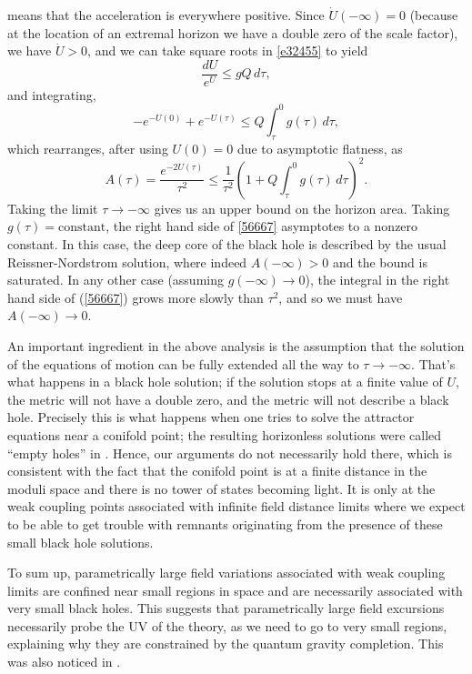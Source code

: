 \documentclass[11pt]{article}
\numberwithin{equation}{section}
\newcommand{\eq}[1]{(\ref{#1})}
\numberwithin{equation}{section}
\theoremstyle{remark}
\begin{document}
means that the acceleration is everywhere positive. Since $\dot{U}(-\infty)=0$ (because at the location of an extremal horizon we have a double zero of the scale factor), we have $\dot{U}>0$, and we can take square roots in \eqref{e32455} to yield
\begin{equation} \frac{dU}{e^{U}}\leq g Q\, d\tau,\end{equation}
and integrating,
\begin{equation} -e^{-U(0)}+e^{-U(\tau)}\leq Q \int_{\tau}^0 g(\tau)\, d\tau,\end{equation}
which rearranges, after using $U(0)=0$ due to asymptotic flatness, as
\begin{equation}A(\tau)=\frac{ e^{-2U(\tau)}}{\tau^2}\leq \frac{1}{\tau^2}\left(1+  Q \int_{\tau}^0 g(\tau)\, d\tau\right)^2.\label{56667}\end{equation}
Taking the limit $\tau\rightarrow-\infty$ gives us an upper bound on the horizon area. Taking $g(\tau)=\text{constant}$, the right hand side of \eqref{56667} asymptotes to a nonzero constant. In this case, the deep core of the black hole is described by the usual Reissner-Nordstrom solution, where indeed $A(-\infty)>0$ and the bound is saturated. In any other case (assuming $g(-\infty)\rightarrow0$), the integral in the right hand side of \eq{56667} grows more slowly than $\tau^2$, and so we must have $A(-\infty)\rightarrow 0$. 

An important ingredient in the above analysis is the assumption that the solution of the equations of motion can be fully extended all the way to $\tau\rightarrow-\infty$. That's what happens in a black hole solution; if the solution stops at a finite value of $U$, the metric will not have a double zero, and the metric will not describe a black hole. Precisely this is what happens when one tries to solve the attractor equations near a conifold point; the resulting horizonless solutions were called ``empty holes'' in \cite{Denef:2000nb}. Hence, our arguments do not necessarily hold there, which is consistent with the fact that the conifold point is at a finite distance in the moduli space and there is no tower of states becoming light. It is only at the weak coupling points associated with infinite field distance limits where we expect to be able to get trouble with remnants originating from the presence of these small black hole solutions. 

To sum up, parametrically large field variations associated with weak coupling limits are confined near small regions in space and are necessarily associated with very small black holes. This suggests that parametrically large field excursions necessarily probe the UV of the theory, as we need to go to very small regions, explaining why they are constrained by the quantum gravity completion. This was also noticed in \cite{Draper:2019utz}.
\end{document}
